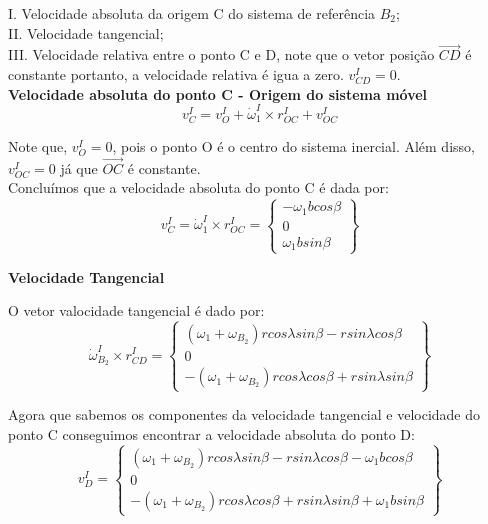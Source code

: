 \documentclass[a4paper, 12pt]{article}
\begin{document}
I. Velocidade absoluta da origem C do sistema de referência $B_2$;\\

II. Velocidade tangencial;\\

III. Velocidade relativa entre o ponto C e D, note que o vetor posição $\vec{CD}$ é constante portanto, a velocidade relativa é igua a zero. $v^I_{CD} = 0$.\\

	\textbf{Velocidade absoluta do ponto C - Origem do sistema móvel}
		\begin{equation}
			v_C^I = v_O^I + \dot{\omega}^I_1 \times r^I_{OC} + v^I_{OC}
		\end{equation}
		
		Note que, $v_O^I = 0$, pois o ponto O é o centro do sistema inercial. Além disso, $v^I_{OC} = 0$ já que $\vec{OC}$ é constante.\\
		
		Concluímos que a velocidade absoluta do ponto C é dada por:
		\begin{equation}
			v_C^I = \dot{\omega}^I_1 \times r^I_{OC} = \begin{Bmatrix}
			-\omega_1bcos\beta\\
			0\\
			\omega_1bsin\beta
			\end{Bmatrix}
		\end{equation}
		
	\textbf{Velocidade Tangencial}
	
		O vetor valocidade tangencial é dado por:
		\begin{equation}
			\dot{\omega}^I_{B_2} \times r^I_{CD} = \begin{Bmatrix}
			(\omega_1 + \omega_{B_2})r cos \lambda sin \beta - rsin\lambda cos \beta\\
			0\\
			-(\omega_1 + \omega_{B_2})rcos\lambda cos\beta + rsin \lambda sin \beta
			\end{Bmatrix}
		\end{equation}
		
		Agora que sabemos os componentes da velocidade tangencial e velocidade do ponto C conseguimos encontrar a velocidade absoluta do ponto D:
		\begin{equation}
			v_D^I = \begin{Bmatrix}
			(\omega_1 + \omega_{B_2})r cos \lambda sin \beta - rsin\lambda cos \beta -\omega_1bcos\beta \\
			0\\
			-(\omega_1 + \omega_{B_2})rcos\lambda cos\beta + rsin \lambda sin \beta + \omega_1bsin\beta
			\end{Bmatrix}
		\end{equation}
		
\end{document}
